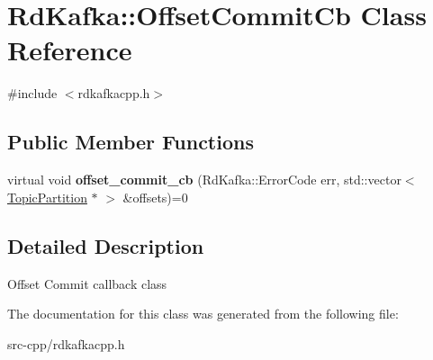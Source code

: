 \hypertarget{classRdKafka_1_1OffsetCommitCb}{\section{Rd\-Kafka\-:\-:Offset\-Commit\-Cb Class Reference}
\label{classRdKafka_1_1OffsetCommitCb}
}


{\ttfamily \#include $<$rdkafkacpp.\-h$>$}

\subsection*{Public Member Functions}
\begin{DoxyCompactItemize}
\item 
\hypertarget{classRdKafka_1_1OffsetCommitCb_adba61797f3db9fd4acf97c3b31deb413}{virtual void {\bfseries offset\-\_\-commit\-\_\-cb} (Rd\-Kafka\-::\-Error\-Code err, std\-::vector$<$ \hyperlink{classRdKafka_1_1TopicPartition}{Topic\-Partition} $\ast$ $>$ \&offsets)=0}\label{classRdKafka_1_1OffsetCommitCb_adba61797f3db9fd4acf97c3b31deb413}

\end{DoxyCompactItemize}


\subsection{Detailed Description}
Offset Commit callback class 

The documentation for this class was generated from the following file\-:\begin{DoxyCompactItemize}
\item 
src-\/cpp/rdkafkacpp.\-h\end{DoxyCompactItemize}
